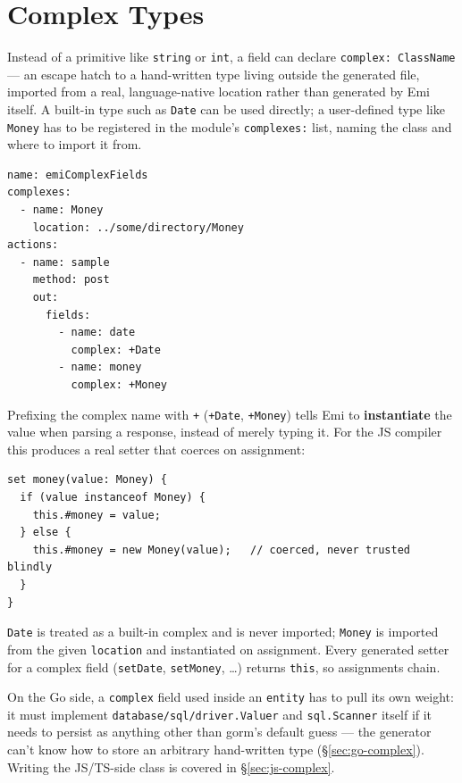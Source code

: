 \section{Complex Types}
\label{sec:complex-types}

Instead of a primitive like \texttt{string} or \texttt{int}, a field can
declare \texttt{complex: ClassName} --- an escape hatch to a hand-written
type living outside the generated file, imported from a real,
language-native location rather than generated by Emi itself. A built-in
type such as \texttt{Date} can be used directly; a user-defined type like
\texttt{Money} has to be registered in the module's \texttt{complexes:}
list, naming the class and where to import it from.

\begin{lstlisting}
name: emiComplexFields
complexes:
  - name: Money
    location: ../some/directory/Money
actions:
  - name: sample
    method: post
    out:
      fields:
        - name: date
          complex: +Date
        - name: money
          complex: +Money
\end{lstlisting}

Prefixing the complex name with \texttt{+} (\texttt{+Date}, \texttt{+Money})
tells Emi to \textbf{instantiate} the value when parsing a response,
instead of merely typing it. For the JS compiler this produces a real
setter that coerces on assignment:

\begin{lstlisting}
set money(value: Money) {
  if (value instanceof Money) {
    this.#money = value;
  } else {
    this.#money = new Money(value);   // coerced, never trusted blindly
  }
}
\end{lstlisting}

\texttt{Date} is treated as a built-in complex and is never imported;
\texttt{Money} is imported from the given \texttt{location} and
instantiated on assignment. Every generated setter for a complex field
(\texttt{setDate}, \texttt{setMoney}, \ldots) returns \texttt{this}, so
assignments chain.

\begin{pullquote}
On the Go side, a \texttt{complex} field used inside an \texttt{entity}
has to pull its own weight: it must implement
\texttt{database/sql/driver.Valuer} and \texttt{sql.Scanner} itself if it
needs to persist as anything other than gorm's default guess --- the
generator can't know how to store an arbitrary hand-written type
(\S\ref{sec:go-complex}). Writing the JS/TS-side class is covered in
\S\ref{sec:js-complex}.
\end{pullquote}
